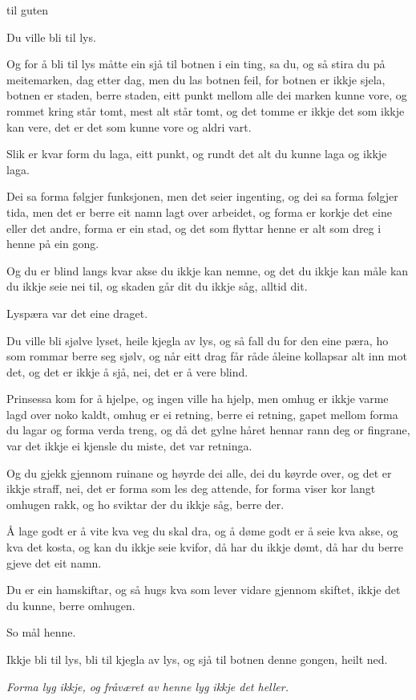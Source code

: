 \documentclass[11pt]{article}
\newcommand{\kicker}[1]{{\footnotesize\addfontfeature{LetterSpace=22}\color{gray}#1}}
\begin{document}
\kicker{til guten}

\vspace{2pt}\noindent{\color{gray}\rule{12mm}{0.4pt}}

\vspace{5mm}

{\large Du ville bli til lys.}

Og for å bli til lys måtte ein sjå til botnen i ein ting, sa du, og så stira du på meitemarken, dag etter dag, men du las botnen feil, for botnen er ikkje sjela, botnen er staden, berre staden, eitt punkt mellom alle dei marken kunne vore, og rommet kring står tomt, mest alt står tomt, og det tomme er ikkje det som ikkje kan vere, det er det som kunne vore og aldri vart.

Slik er kvar form du laga, eitt punkt, og rundt det alt du kunne laga og ikkje laga.

Dei sa forma følgjer funksjonen, men det seier ingenting, og dei sa forma følgjer tida, men det er berre eit namn lagt over arbeidet, og forma er korkje det eine eller det andre, forma er ein stad, og det som flyttar henne er alt som dreg i henne på ein gong.

Og du er blind langs kvar akse du ikkje kan nemne, og det du ikkje kan måle kan du ikkje seie nei til, og skaden går dit du ikkje såg, alltid dit.

Lyspæra var det eine draget.

Du ville bli sjølve lyset, heile kjegla av lys, og så fall du for den eine pæra, ho som rommar berre seg sjølv, og når eitt drag får råde åleine kollapsar alt inn mot det, og det er ikkje å sjå, nei, det er å vere blind.

Prinsessa kom for å hjelpe, og ingen ville ha hjelp, men omhug er ikkje varme lagd over noko kaldt, omhug er ei retning, berre ei retning, gapet mellom forma du lagar og forma verda treng, og då det gylne håret hennar rann deg or fingrane, var det ikkje ei kjensle du miste, det var retninga.

Og du gjekk gjennom ruinane og høyrde dei alle, dei du køyrde over, og det er ikkje straff, nei, det er forma som les deg attende, for forma viser kor langt omhugen rakk, og ho sviktar der du ikkje såg, berre der.

Å lage godt er å vite kva veg du skal dra, og å døme godt er å seie kva akse, og kva det kosta, og kan du ikkje seie kvifor, då har du ikkje dømt, då har du berre gjeve det eit namn.

Du er ein hamskiftar, og så hugs kva som lever vidare gjennom skiftet, ikkje det du kunne, berre omhugen.

So mål henne.

Ikkje bli til lys, bli til kjegla av lys, og sjå til botnen denne gongen, heilt ned.

{\itshape Forma lyg ikkje, og fråværet av henne lyg ikkje det heller.}
\end{document}
